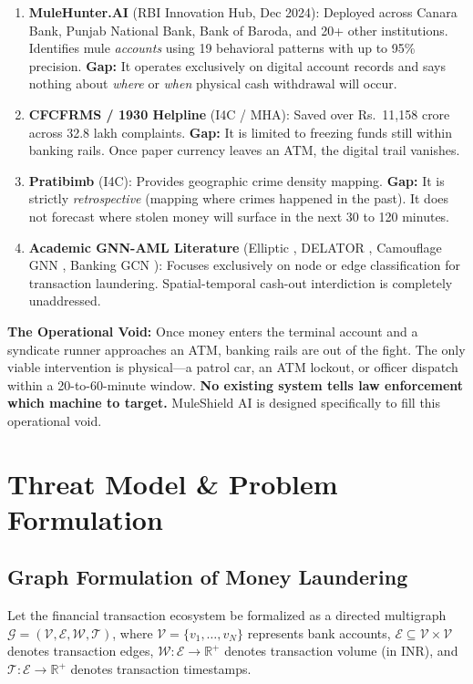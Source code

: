\documentclass[conference]{IEEEtran}
\begin{document}
\begin{enumerate}
    \item \textbf{MuleHunter.AI} (RBI Innovation Hub, Dec 2024): Deployed across Canara Bank, Punjab National Bank, Bank of Baroda, and 20+ other institutions. Identifies mule \textit{accounts} using 19 behavioral patterns with up to 95\% precision. \textbf{Gap:} It operates exclusively on digital account records and says nothing about \textit{where} or \textit{when} physical cash withdrawal will occur.
    \item \textbf{CFCFRMS / 1930 Helpline} (I4C / MHA): Saved over Rs.~11,158 crore across 32.8 lakh complaints. \textbf{Gap:} It is limited to freezing funds still within banking rails. Once paper currency leaves an ATM, the digital trail vanishes.
    \item \textbf{Pratibimb} (I4C): Provides geographic crime density mapping. \textbf{Gap:} It is strictly \textit{retrospective} (mapping where crimes happened in the past). It does not forecast where stolen money will surface in the next 30 to 120 minutes.
    \item \textbf{Academic GNN-AML Literature} (Elliptic \cite{weber2019}, DELATOR \cite{assumpção2022}, Camouflage GNN \cite{dou2020}, Banking GCN \cite{wang2019}): Focuses exclusively on node or edge classification for transaction laundering. Spatial-temporal cash-out interdiction is completely unaddressed.
\end{enumerate}

\textbf{The Operational Void:} Once money enters the terminal account and a syndicate runner approaches an ATM, banking rails are out of the fight. The only viable intervention is physical---a patrol car, an ATM lockout, or officer dispatch within a 20-to-60-minute window. \textbf{No existing system tells law enforcement which machine to target.} MuleShield AI is designed specifically to fill this operational void.

\section{Threat Model \& Problem Formulation}

\subsection{Graph Formulation of Money Laundering}
Let the financial transaction ecosystem be formalized as a directed multigraph $\mathcal{G} = (\mathcal{V}, \mathcal{E}, \mathcal{W}, \mathcal{T})$, where $\mathcal{V} = \{v_1, \dots, v_N\}$ represents bank accounts, $\mathcal{E} \subseteq \mathcal{V} \times \mathcal{V}$ denotes transaction edges, $\mathcal{W}: \mathcal{E} \to \mathbb{R}^+$ denotes transaction volume (in INR), and $\mathcal{T}: \mathcal{E} \to \mathbb{R}^+$ denotes transaction timestamps.
\end{document}
